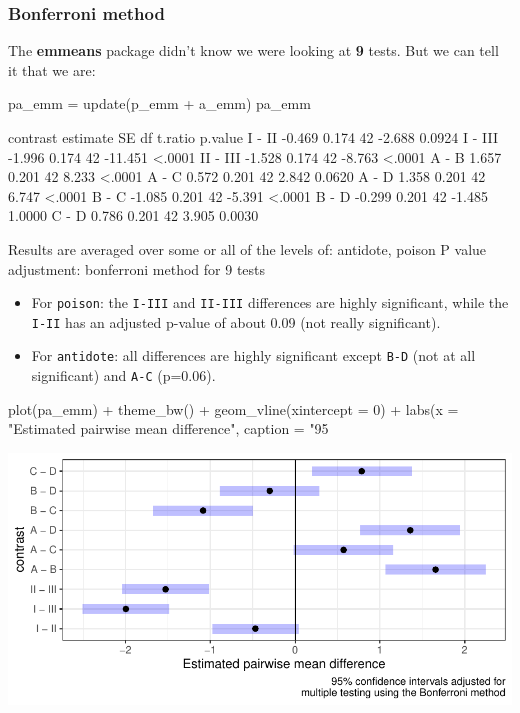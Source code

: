 \documentclass[a4paper]{article}\usepackage[]{graphicx}\usepackage[]{xcolor}
\makeatletter
\def\maxwidth{ %
  \ifdim\Gin@nat@width>\linewidth
    \linewidth
  \else
    \Gin@nat@width
  \fi
}
\makeatother
\begin{document}
\subsubsection{Bonferroni method}
The \textbf{emmeans} package didn't know we were looking at \textbf{9} tests. But we can tell it that we are:
\begin{Schunk}
\begin{Sinput}
pa_emm = update(p_emm + a_emm)
pa_emm
\end{Sinput}
\begin{Soutput}
 contrast estimate    SE df t.ratio p.value
 I - II     -0.469 0.174 42  -2.688  0.0924
 I - III    -1.996 0.174 42 -11.451  <.0001
 II - III   -1.528 0.174 42  -8.763  <.0001
 A - B       1.657 0.201 42   8.233  <.0001
 A - C       0.572 0.201 42   2.842  0.0620
 A - D       1.358 0.201 42   6.747  <.0001
 B - C      -1.085 0.201 42  -5.391  <.0001
 B - D      -0.299 0.201 42  -1.485  1.0000
 C - D       0.786 0.201 42   3.905  0.0030

Results are averaged over some or all of the levels of: antidote, poison 
P value adjustment: bonferroni method for 9 tests 
\end{Soutput}
\end{Schunk}
\begin{itemize}
	\item For \lstinline|poison|: the \lstinline|I-III| and \lstinline|II-III| differences are highly significant, while the \lstinline|I-II| has an adjusted p-value of about 0.09 (not really significant).
	\item For \lstinline|antidote|: all differences are highly significant except \lstinline|B-D| (not at all significant) and \lstinline|A-C| (p=0.06).
\end{itemize}
\begin{Schunk}
\begin{Sinput}
plot(pa_emm) + theme_bw() + geom_vline(xintercept = 0) + 
  labs(x = "Estimated pairwise mean difference", 
       caption = "95%
\end{Sinput}


{\centering \includegraphics[width=\maxwidth]{figure/listings-unnamed-chunk-331-1} 

}

\end{Schunk}
\end{document}
